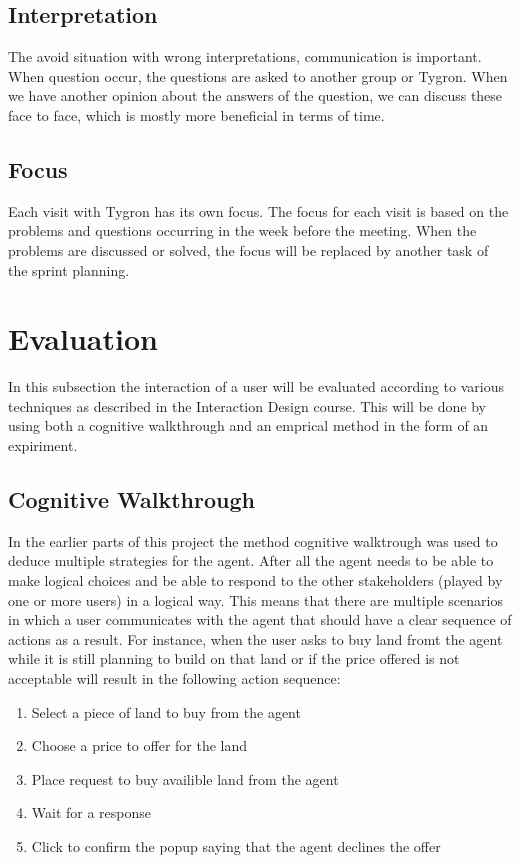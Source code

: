\subsection{Interpretation}
The avoid situation with wrong interpretations, communication is important. When question occur, the questions are asked to another group or Tygron. When we have another opinion about the answers of the question, we can discuss these face to face, which is mostly more beneficial in terms of time. 

\subsection{Focus}
Each visit with Tygron has its own focus. The focus for each visit is based on the problems and questions occurring in the week before the meeting. When the problems are discussed or solved, the focus will be replaced by another task of the sprint planning. 

\newpage

\section{Evaluation}
In this subsection the interaction of a user will be evaluated according to various techniques as described in the Interaction Design course. This will be done by using both a cognitive walkthrough and an emprical method in the form of an expiriment.

\subsection{Cognitive Walkthrough}

In the earlier parts of this project the method cognitive walktrough was used to deduce multiple strategies for the agent. After all the agent needs to be able to make logical choices and be able to respond to the other stakeholders (played by one or more users) in a logical way. This means that there are multiple scenarios in which a user communicates with the agent that should have a clear sequence of actions as a result. For instance, when the user asks to buy land fromt the agent while it is still planning to build on that land or if the price offered is not acceptable will result in the following action sequence: 
\begin{enumerate}
\item Select a piece of land to buy from the agent
\item Choose a price to offer for the land
\item Place request to buy availible land from the agent
\item Wait for a response
\item Click to confirm the popup saying that the agent declines the offer
\end{enumerate}

